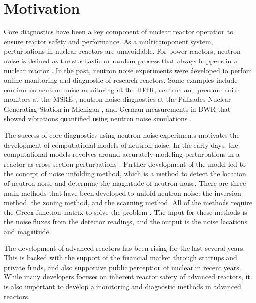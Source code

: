 \label{ch:introduction}

\section{Motivation}

Core diagnostics have been a key component of nuclear reactor operation to ensure reactor safety and performance. As a multicomponent system, perturbations in nuclear reactors are unavoidable. For power reactors, neutron noise is defined as the stochastic or random process that always happens in a nuclear reactor \cite{saitoTheoryPowerReactor1974b}. In the past, neutron noise experiments were developed to perfom online monitoring and diagnostic of research reactors. Some examples include continuous neutron noise monitoring at the \gls*{HFIR}, neutron and pressure noise monitors at the \gls*{MSRE} \cite{fryExperienceReactorMalfunction1971}, neutron noise diagnostics at the Palisades Nuclear Generating Station in Michigan \cite{fryAnalysisNeutrondensityOscillations1975}, and German measurements in \gls*{BWR} that showed vibrations quantified using neutron noise simulations \cite{wachInvestigationJointEffect1974}.

The success of core diagnostics using neutron noise experiments motivates the development of computational models of neutron noise. In the early days, the computational models revolves around accurately modeling perturbations in a reactor as cross-section perturbations \cite{saitoTheoryPowerReactor1974,saitoTheoryPowerReactor1974a}. Further development of the model led to the concept of noise unfolding method, which is a method to detect the location of neutron noise and determine the magnitude of neutron noise. There are three main methods that have been developed to unfold neutron noise: the inversion method, the zoning method, and the scanning method. All of the methods require the Green function matrix to solve the problem \cite{pazsitNoiseTechniquesNuclear2010}. The input for these methods is the noise fluxes from the detector readings, and the output is the noise locations and magnitude.

The development of advanced reactors has been rising for the last several years. This is backed with the support of the financial market through startups and private funds, and also supportive public perception of nuclear in recent years. While many developers focuses on inherent reactor safety of advanced reactors, it is also important to develop a monitoring and diagnostic methods in advanced reactors.

